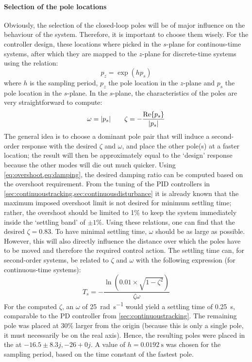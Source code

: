 \paragraph{Selection of the pole locations} Obviously, the selection of the closed-loop poles will be of major influence on the behaviour of the system. Therefore, it is important to choose them wisely. For the controller design, these locations where picked in the $s$-plane for continous-time systems, after which they are mapped to the $z$-plane for discrete-time systems using the relation:
\begin{equation}
    p_z = \exp(hp_s) 
    \label{eq:polemapping}
\end{equation}
where $h$ is the sampling period, $p_z$ the pole location in the $z$-plane and $p_s$ the pole location in the $s$-plane. In the $s$-plane, the characteristics of the poles are very straightforward to compute:
$$ \omega = \abs{p_s} \qquad \zeta = -\frac{\Re{p_s}}{\abs{p_s}}$$
The general idea is to choose a dominant pole pair that will induce a second-order response with the desired $\zeta$ and $\omega$, and place the other pole(s) at a faster location; the result will then be approximately equal to the `design' response because the other modes will die out much quicker.
Using \cref{eq:overshoot,eq:damping}, the desired damping ratio can be computed based on the overshoot requirement. From the tuning of the PID controllers in \cref{sec:continuoustracking,sec:continuousdisturbance} it is already known that the maximum imposed overshoot limit is not desired for minimum settling time; rather, the overshoot should be limited to 1\% to keep the system immediately inside the `settling band' of $\pm 1\%$. Using these relations, one can find that the desired $\zeta = 0.83$. To have minimal settling time, $\omega$ should be as large as possible. However, this will also directly influence the distance over which the poles have to be moved and therefore the required control action. The settling time can, for second-order systems, be related to $\zeta$ and $\omega$ with the following expression (for continuous-time systems): \cite{nise}
$$ T_s = -\frac{\ln(0.01\times\sqrt{1 - \zeta^2})}{\zeta\omega}$$
For the computed $\zeta$, an $\omega$ of \SI{25}{\radian\per\second} would yield a settling time of \SI{0.25}{\second}, comparable to the PD controller from \cref{sec:continuoustracking}. The remaining pole was placed at 30\% larger from the origin (because this is only a single pole, it must necessarily be on the real axis).
Hence, the resulting poles were placed in the at $-16.5 \pm 8.3j, -26 + 0j$. A value of $h = \SI{0.0192}{\second}$ was chosen for the sampling period, based on the time constant of the fastest pole.

